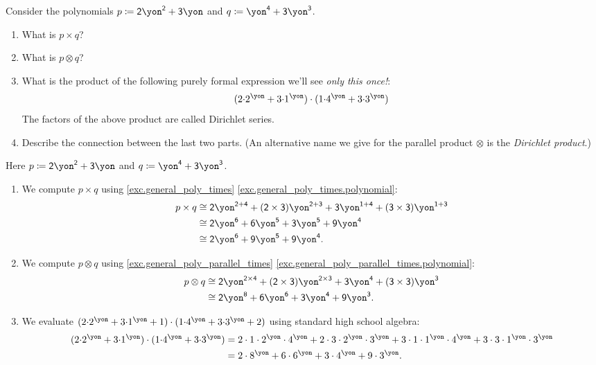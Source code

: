 \documentclass[Book-Poly]{subfiles}
\begin{document}
\begin{exercise}
Consider the polynomials $p\coloneqq \2\yon^\2+\3\yon$ and $q\coloneqq\yon^\4+\3\yon^\3$.
\begin{enumerate}
	\item What is $p\times q$?
	\item What is $p\otimes q$?
	\item What is the product of the following purely formal expression we'll see \emph{only this once!}:
	\[
	(2\mdot2^\yon+3\mdot 1^\yon) \cdot 
	(1\mdot4^\yon+3\mdot 3^\yon)
	\]
    The factors of the above product are called Dirichlet series.
	\item Describe the connection between the last two parts. (An alternative name we give for the parallel product $\otimes$ is the \emph{Dirichlet product}.) \qedhere
\end{enumerate}
\begin{solution}
Here $p\coloneqq \2\yon^\2+\3\yon$ and $q\coloneqq\yon^\4+\3\yon^\3$.
\begin{enumerate}
    \item We compute $p \times q$ using \cref{exc.general_poly_times} \cref{exc.general_poly_times.polynomial}:
    \begin{align*}
        p \times q &\iso \2\yon^{\2 + \4} + (\2 \times \3)\yon^{\2 + \3} + \3\yon^{\1 + \4} + (\3 \times \3)\yon^{\1 + \3} \\
        &\iso \2\yon^\6 + \6\yon^\5 + \3\yon^\5 + \9\yon^\4 \\
        &\iso \2\yon^\6 + \9\yon^\5 + \9\yon^\4.
    \end{align*}
    
    \item We compute $p \otimes q$ using \cref{exc.general_poly_parallel_times} \cref{exc.general_poly_parallel_times.polynomial}:
    \begin{align*}
        p \otimes q &\iso \2\yon^{\2 \times \4} + (\2 \times \3)\yon^{\2 \times \3} + \3\yon^\4 + (\3 \times \3)\yon^\3 \\
        &\iso \2\yon^\8 + \6\yon^\6 + \3\yon^\4 + \9\yon^\3.
    \end{align*}
    
    \item We evaluate $(2\mdot2^\yon+3\mdot 1^\yon+1) \cdot 
	(1\mdot4^\yon+3\mdot 3^\yon+2)$ using standard high school algebra:
    \begin{align*}
	    (2\mdot2^\yon+3\mdot 1^\yon) \cdot (1\mdot4^\yon+3\mdot 3^\yon) &= 2\cdot1\cdot2^\yon\cdot4^\yon + 2\cdot3\cdot2^\yon\cdot3^\yon + 3\cdot1\cdot1^\yon\cdot4^\yon + 3\cdot3\cdot1^\yon\cdot3^\yon \\
	    &= 2\cdot8^\yon + 6\cdot6^\yon + 3\cdot4^\yon + 9\cdot3^\yon.
	\end{align*}
	

\end{enumerate}
\end{solution}
\end{exercise}
\end{document}
